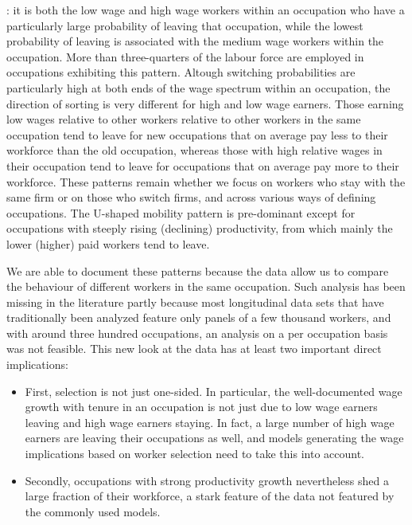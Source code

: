 \documentclass[12pt]{article}
\newcommand{\highlightP}[1]{{\emph{\color{MyPink}{#1}}}}
\theoremstyle{definition}
\begin{document}
\highlightP{We document that for most occupations, mobility is U-shaped and directional}: it is both the low wage and high wage workers within an occupation who have a particularly large probability of leaving that occupation, while the lowest probability of leaving is associated with the medium wage workers within the occupation. More than three-quarters of the labour force are employed in occupations exhibiting this pattern. Altough switching probabilities are particularly high at both ends of the wage spectrum within an occupation, the direction of sorting is very different for high and low wage earners. Those earning low wages relative to other workers relative to other workers in the same occupation tend to leave for new occupations that on average pay less to their workforce than the old occupation, whereas those with high relative wages in their occupation tend to leave for occupations that on average pay more to their workforce. These patterns remain whether we focus on workers who stay with the same firm or on those who switch firms, and across various ways of defining occupations. The U-shaped mobility pattern is pre-dominant except for occupations with steeply rising (declining) productivity, from which mainly the lower (higher) paid workers tend to leave.

We are able to document these patterns because the data allow us to compare the behaviour of different workers in the same occupation. Such analysis has been missing in the literature partly because most longitudinal data sets that have traditionally been analyzed feature only panels of a few thousand workers, and with around three hundred occupations, an analysis on a per occupation basis was not feasible. This new look at the data has at least two important direct implications:
\begin{itemize}[topsep=0pt, leftmargin=20pt, itemsep=0pt]
	\setlength{\parskip}{10pt} 
	\item First, selection is not just one-sided. In particular, the well-documented wage growth with tenure in an occupation is not just due to low wage earners leaving and high wage earners staying. In fact, a large number of high wage earners are leaving their occupations as well, and models generating the wage implications based on worker selection need to take this into account.
	\item Secondly, occupations with strong productivity growth nevertheless shed a large fraction of their workforce, a stark feature of the data not featured by the commonly used models.
\end{itemize}
\end{document}
